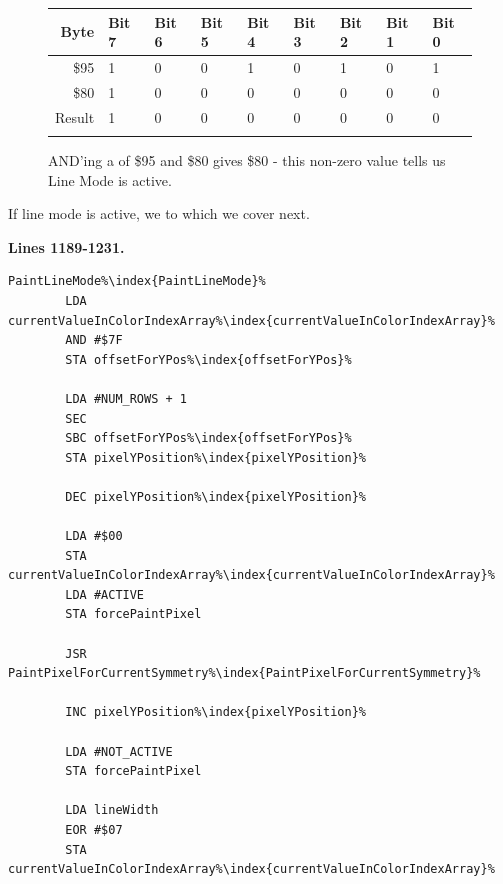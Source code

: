 \begin{figure}[H]
  {
    \setlength{\tabcolsep}{3.0pt}
    \setlength\cmidrulewidth{\heavyrulewidth} %
    \begin{adjustbox}{width=7cm,center}

      \begin{tabular}{rllllllll}
        \toprule
        Byte & Bit 7 & Bit 6 & Bit 5 & Bit 4 & Bit 3 & Bit 2 & Bit 1 & Bit 0        \\
        \midrule
        \$95 & 1 & 0 & 0 & 1 & 0 & 1 & 0 & 1 \\
        \$80 & 1 & 0 & 0 & 0 & 0 & 0 & 0 & 0 \\
        \midrule
      Result & 1 & 0 & 0 & 0 & 0 & 0 & 0 & 0 \\
        \addlinespace
        \bottomrule
      \end{tabular}

    \end{adjustbox}

  }\caption*{AND'ing a  of \$95 and \$80 gives \$80 - this non-zero value tells us Line Mode is active.}
\end{figure}

If line mode is active, we  to  which we cover next.

\clearpage
\textbf{Lines 1189-1231. } 
\begin{lstlisting}[caption=From \icode{PaintLineMode\index{PaintLineMode}}.,escapechar=\%]
PaintLineMode%\index{PaintLineMode}% 
        LDA currentValueInColorIndexArray%\index{currentValueInColorIndexArray}%
        AND #$7F
        STA offsetForYPos%\index{offsetForYPos}%

        LDA #NUM_ROWS + 1
        SEC 
        SBC offsetForYPos%\index{offsetForYPos}%
        STA pixelYPosition%\index{pixelYPosition}%

        DEC pixelYPosition%\index{pixelYPosition}%

        LDA #$00
        STA currentValueInColorIndexArray%\index{currentValueInColorIndexArray}%
        LDA #ACTIVE
        STA forcePaintPixel

        JSR PaintPixelForCurrentSymmetry%\index{PaintPixelForCurrentSymmetry}%

        INC pixelYPosition%\index{pixelYPosition}%

        LDA #NOT_ACTIVE
        STA forcePaintPixel

        LDA lineWidth
        EOR #$07
        STA currentValueInColorIndexArray%\index{currentValueInColorIndexArray}%
\end{lstlisting}
\clearpage

